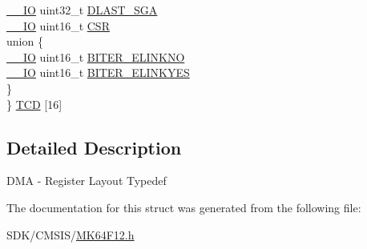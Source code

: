 \begin{DoxyCompactItemize}
\begin{tabbing}
\>\mbox{\hyperlink{core__cm4_8h_aec43007d9998a0a0e01faede4133d6be}{\_\_IO}} uint32\_t \mbox{\hyperlink{group___v_r_e_f___peripheral___access___layer_gadf082fdeed70ba0ae69108d9f081ffcd}{DLAST\_SGA}}\\
\>\mbox{\hyperlink{core__cm4_8h_aec43007d9998a0a0e01faede4133d6be}{\_\_IO}} uint16\_t \mbox{\hyperlink{group___v_r_e_f___peripheral___access___layer_gab5d0eeb11a728846c639375a18225d1f}{CSR}}\\
\>union \{\\
\>\>\mbox{\hyperlink{core__cm4_8h_aec43007d9998a0a0e01faede4133d6be}{\_\_IO}} uint16\_t \mbox{\hyperlink{group___v_r_e_f___peripheral___access___layer_gad63eb624e138bbf46358e24f2c4dd2b9}{BITER\_ELINKNO}}\\
\>\>\mbox{\hyperlink{core__cm4_8h_aec43007d9998a0a0e01faede4133d6be}{\_\_IO}} uint16\_t \mbox{\hyperlink{group___v_r_e_f___peripheral___access___layer_ga5263f1dc5e2f995abda4a3af52b1a09c}{BITER\_ELINKYES}}\\
\>\} \\
\} \mbox{\hyperlink{group___v_r_e_f___peripheral___access___layer_ga580b2d1eee871c5b190f951fb6f753e3}{TCD}} \mbox{[}16\mbox{]}\\

\end{tabbing}\end{DoxyCompactItemize}


\subsection{Detailed Description}
D\+MA -\/ Register Layout Typedef 

The documentation for this struct was generated from the following file\+:\begin{DoxyCompactItemize}
\item 
S\+D\+K/\+C\+M\+S\+I\+S/\mbox{\hyperlink{_m_k64_f12_8h}{M\+K64\+F12.\+h}}\end{DoxyCompactItemize}
